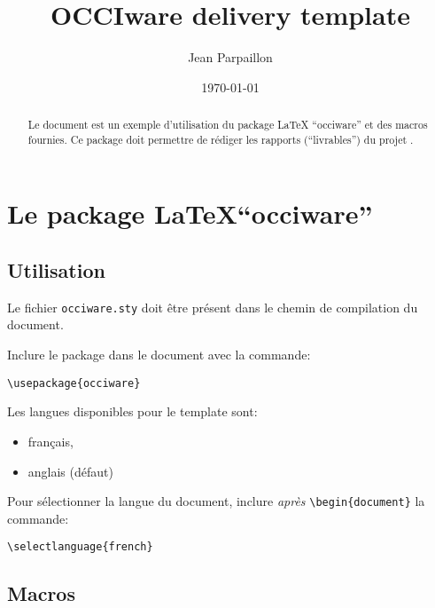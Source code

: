 \documentclass[a4paper,11pt,twoside]{report}
\begin{document}

\title{OCCIware delivery template}

\author{Jean Parpaillon}


\date{\today}

\maketitle

\begin{abstract}
  Le document est un exemple d'utilisation du package \LaTeX
  ``occiware'' et des macros fournies. Ce package doit permettre de
  rédiger les rapports (``livrables'') du projet \occiware.
\end{abstract}

\chapter{Le package \LaTeX ``occiware''}
\label{chap:one}

\section{Utilisation}
\label{sec:utilisation}

Le fichier \texttt{occiware.sty} doit être présent dans le chemin de
compilation du document.

Inclure le package dans le document avec la commande:

\begin{verbatim}
\usepackage{occiware}
\end{verbatim}

Les langues disponibles pour le template sont:
\begin{itemize}
\item français,
\item anglais (défaut)
\end{itemize}

Pour sélectionner la langue du document, inclure \emph{après}
  \verb+\begin{document}+ la commande:

\begin{verbatim}
\selectlanguage{french}
\end{verbatim}

\section{Macros}
\label{sec:macros}
\end{document}
